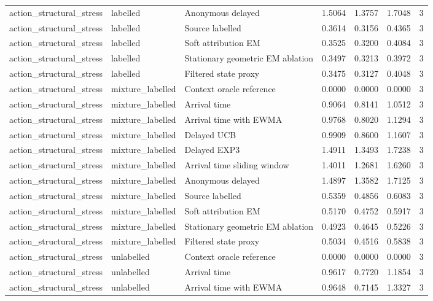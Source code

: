 \begin{tabular}{llllllr}
action\_structural\_stress & labelled & Anonymous delayed & 1.5064 & 1.3757 & 1.7048 & 3 \\
action\_structural\_stress & labelled & Source labelled & 0.3614 & 0.3156 & 0.4365 & 3 \\
action\_structural\_stress & labelled & Soft attribution EM & 0.3525 & 0.3200 & 0.4084 & 3 \\
action\_structural\_stress & labelled & Stationary geometric EM ablation & 0.3497 & 0.3213 & 0.3972 & 3 \\
action\_structural\_stress & labelled & Filtered state proxy & 0.3475 & 0.3127 & 0.4048 & 3 \\
action\_structural\_stress & mixture\_labelled & Context oracle reference & 0.0000 & 0.0000 & 0.0000 & 3 \\
action\_structural\_stress & mixture\_labelled & Arrival time & 0.9064 & 0.8141 & 1.0512 & 3 \\
action\_structural\_stress & mixture\_labelled & Arrival time with EWMA & 0.9768 & 0.8020 & 1.1294 & 3 \\
action\_structural\_stress & mixture\_labelled & Delayed UCB & 0.9909 & 0.8600 & 1.1607 & 3 \\
action\_structural\_stress & mixture\_labelled & Delayed EXP3 & 1.4911 & 1.3493 & 1.7238 & 3 \\
action\_structural\_stress & mixture\_labelled & Arrival time sliding window & 1.4011 & 1.2681 & 1.6260 & 3 \\
action\_structural\_stress & mixture\_labelled & Anonymous delayed & 1.4897 & 1.3582 & 1.7125 & 3 \\
action\_structural\_stress & mixture\_labelled & Source labelled & 0.5359 & 0.4856 & 0.6083 & 3 \\
action\_structural\_stress & mixture\_labelled & Soft attribution EM & 0.5170 & 0.4752 & 0.5917 & 3 \\
action\_structural\_stress & mixture\_labelled & Stationary geometric EM ablation & 0.4923 & 0.4645 & 0.5226 & 3 \\
action\_structural\_stress & mixture\_labelled & Filtered state proxy & 0.5034 & 0.4516 & 0.5838 & 3 \\
action\_structural\_stress & unlabelled & Context oracle reference & 0.0000 & 0.0000 & 0.0000 & 3 \\
action\_structural\_stress & unlabelled & Arrival time & 0.9617 & 0.7720 & 1.1854 & 3 \\
action\_structural\_stress & unlabelled & Arrival time with EWMA & 0.9648 & 0.7145 & 1.3327 & 3 \\

\end{tabular}
